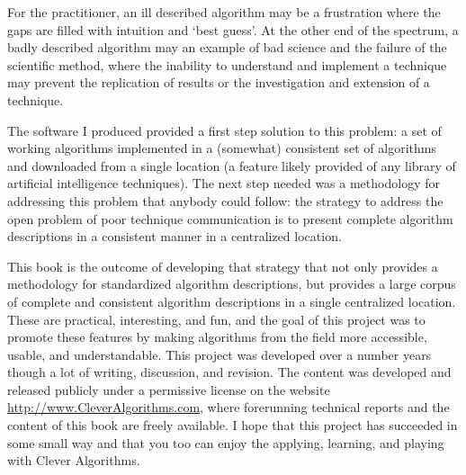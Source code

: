 For the practitioner, an ill described algorithm may be a frustration where the gaps are filled with intuition and `best guess'. At the other end of the spectrum, a badly described algorithm may an example of bad science and the failure of the scientific method, where the inability to understand and implement a technique may prevent the replication of results or the investigation and extension of a technique. 

The software I produced provided a first step solution to this problem: a set of working algorithms implemented in a (somewhat) consistent set of algorithms and downloaded from a single location (a feature likely provided of any library of artificial intelligence techniques). The next step needed was a methodology for addressing this problem that anybody could follow: the strategy to address the open problem of poor technique communication is to present complete algorithm descriptions in a consistent manner in a centralized location.

This book is the outcome of developing that strategy that not only provides a methodology for standardized algorithm descriptions, but provides a large corpus of complete and consistent algorithm descriptions in a single centralized location. 
These are practical, interesting, and fun, and the goal of this project was to promote these features by making algorithms from the field more accessible, usable, and understandable.
This project was developed over a number years though a lot of writing, discussion, and revision. The content was developed and released publicly under a permissive license on the website \url{http://www.CleverAlgorithms.com}, where forerunning technical reports and the content of this book are freely available.
I hope that this project has succeeded in some small way and that you too can enjoy the applying, learning, and playing with Clever Algorithms. 



% 
% 
